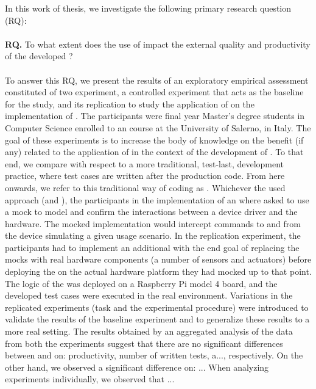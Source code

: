 In this work of thesis, we investigate the following primary research question (RQ):
\\ \ \\
\noindent \textbf{RQ.} To what extent does the use of \tdd impact the external quality and productivity of the developed \es?	
\\ \ \\
To answer this RQ, we present the results of an exploratory empirical assessment constituted of two experiment, a controlled experiment that acts as the baseline for the study, and its replication to study the application of \tdd on the implementation of \ess. The participants were final year Master's degree students in Computer Science enrolled to an \es course at the University of Salerno, in Italy. The goal of these experiments is to increase the body of knowledge on the benefit (if any) related to the application of \tdd in the context of the development of \ess. To that end, we compare \tdd with respect to a more traditional, test-last, development practice, where test cases are written after the production code. From here onwards, we refer to this traditional way of coding as \notdd. Whichever the used approach (\tdd and \notdd), the participants in the implementation of an \es where asked to use a mock to model and confirm the interactions between a device driver and the hardware. The mocked implementation would intercept commands to and from the device simulating a given usage scenario. In the replication experiment, the participants had to implement an additional \es with the end goal of replacing the mocks with real hardware components (a number of sensors and actuators) before deploying the \es on the actual hardware platform they had mocked up to that point. The logic of the \es was deployed on a Raspberry Pi model 4 board, and the developed test cases were executed in the real environment. Variations in the replicated experiments (task and the experimental procedure) were introduced to validate the results of the baseline experiment and to generalize these results to a more real setting. The results obtained by an aggregated analysis of the data from both the experiments suggest that there are no significant differences between \tdd and \notdd on: productivity, number of written tests, a..., respectively. On the other hand, we observed a significant difference on: ... When analyzing experiments individually, we observed that ...

